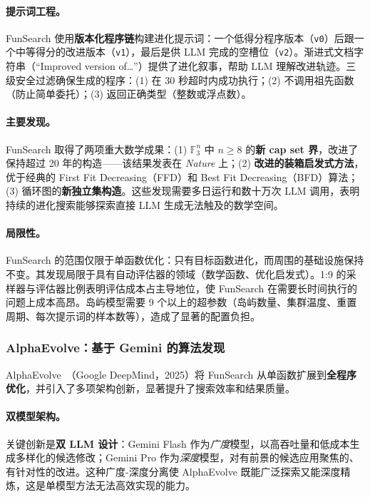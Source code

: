\paragraph{提示词工程。}
FunSearch 使用\textbf{版本化程序链}构建进化提示词：一个低得分程序版本（\texttt{v0}）后跟一个中等得分的改进版本（\texttt{v1}），最后是供 LLM 完成的空槽位（\texttt{v2}）。渐进式文档字符串（``Improved version of\ldots''）提供了进化叙事，帮助 LLM 理解改进轨迹。三级安全过滤确保生成的程序：(1) 在 30 秒超时内成功执行；(2) 不调用祖先函数（防止简单委托）；(3) 返回正确类型（整数或浮点数）。

\paragraph{主要发现。}
FunSearch 取得了两项重大数学成果：(1) $\mathbb{F}_3^n$ 中 $n \geq 8$ 的\textbf{新 cap set 界}，改进了保持超过 20 年的构造——该结果发表在 \textit{Nature} 上；(2) \textbf{改进的装箱启发式方法}，优于经典的 First Fit Decreasing（FFD）和 Best Fit Decreasing（BFD）算法；(3) 循环图的\textbf{新独立集构造}。这些发现需要多日运行和数十万次 LLM 调用，表明持续的进化搜索能够探索直接 LLM 生成无法触及的数学空间。

\paragraph{局限性。}
FunSearch 的范围仅限于单函数优化：只有目标函数进化，而周围的基础设施保持不变。其发现局限于具有自动评估器的领域（数学函数、优化启发式）。1:9 的采样器与评估器比例表明评估成本占主导地位，使 FunSearch 在需要长时间执行的问题上成本高昂。岛屿模型需要 9 个以上的超参数（岛屿数量、集群温度、重置周期、每次提示词的样本数等），造成了显著的配置负担。


\subsubsection{AlphaEvolve：基于 Gemini 的算法发现}

AlphaEvolve~\citep{alphaevolve2025}（Google DeepMind，2025）将 FunSearch 从单函数扩展到\textbf{全程序优化}，并引入了多项架构创新，显著提升了搜索效率和结果质量。

\paragraph{双模型架构。}
关键创新是\textbf{双 LLM 设计}：Gemini Flash 作为\emph{广度}模型，以高吞吐量和低成本生成多样化的候选修改；Gemini Pro 作为\emph{深度}模型，对有前景的候选应用聚焦的、有针对性的改进。这种广度-深度分离使 AlphaEvolve 既能广泛探索又能深度精炼，这是单模型方法无法高效实现的能力。


